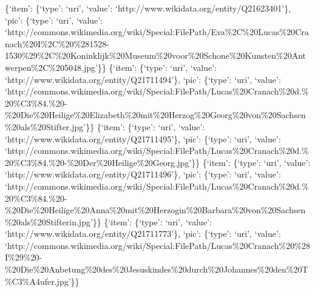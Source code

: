 \documentclass[
  letterpaper,
]{book}
\begin{document}
\{`item': \{`type': `uri', `value':
`http://www.wikidata.org/entity/Q21623401'\}, `pic': \{`type': `uri',
`value':
`http://commons.wikimedia.org/wiki/Special:FilePath/Eva\%2C\%20Lucas\%20Cranach\%20I\%2C\%20\%281528-1530\%29\%2C\%20Koninklijk\%20Museum\%20voor\%20Schone\%20Kunsten\%20Antwerpen\%2C\%205048.jpg'\}\}
\{`item': \{`type': `uri', `value':
`http://www.wikidata.org/entity/Q21711494'\}, `pic': \{`type': `uri',
`value':
`http://commons.wikimedia.org/wiki/Special:FilePath/Lucas\%20Cranach\%20d.\%20\%C3\%84.\%20-\%20Die\%20Heilige\%20Elizabeth\%20mit\%20Herzog\%20Georg\%20von\%20Sachsen\%20als\%20Stifter.jpg'\}\}
\{`item': \{`type': `uri', `value':
`http://www.wikidata.org/entity/Q21711495'\}, `pic': \{`type': `uri',
`value':
`http://commons.wikimedia.org/wiki/Special:FilePath/Lucas\%20Cranach\%20d.\%20\%C3\%84.\%20-\%20Der\%20Heilige\%20Georg.jpg'\}\}
\{`item': \{`type': `uri', `value':
`http://www.wikidata.org/entity/Q21711496'\}, `pic': \{`type': `uri',
`value':
`http://commons.wikimedia.org/wiki/Special:FilePath/Lucas\%20Cranach\%20d.\%20\%C3\%84.\%20-\%20Die\%20Heilige\%20Anna\%20mit\%20Herzogin\%20Barbara\%20von\%20Sachsen\%20als\%20Stifterin.jpg'\}\}
\{`item': \{`type': `uri', `value':
`http://www.wikidata.org/entity/Q21711773'\}, `pic': \{`type': `uri',
`value':
`http://commons.wikimedia.org/wiki/Special:FilePath/Lucas\%20Cranach\%20\%28I\%29\%20-\%20Die\%20Anbetung\%20des\%20Jesuskindes\%20durch\%20Johannes\%20den\%20T\%C3\%A4ufer.jpg'\}\}


\backmatter
\end{document}
